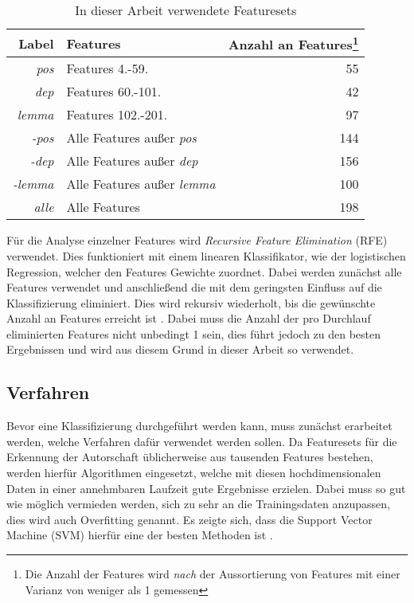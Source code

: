 \begin{table}[h]
\centering
\begin{spacing}{1.25}
\begin{tabular}{rlr}
Label & Features & Anzahl an Features\footnote{Die Anzahl der Features wird \emph{nach} der Aussortierung von Features mit einer Varianz von weniger als 1 gemessen}\\
\midrule
\emph{pos} & Features 4.-59. & 55\\
\emph{dep} & Features 60.-101. & 42\\
\emph{lemma} & Features 102.-201. & 97\\
\emph{-pos} & Alle Features außer \emph{pos} & 144\\
\emph{-dep} & Alle Features außer \emph{dep}& 156\\
\emph{-lemma} & Alle Features außer \emph{lemma} & 100\\
\emph{alle} & Alle Features & 198\\
\end{tabular}
\caption{In dieser Arbeit verwendete Featuresets}
\label{table.featuresets}
\end{spacing}
\end{table}

Für die Analyse einzelner Features wird \textit{Recursive Feature Elimination} (RFE) verwendet. Dies funktioniert mit einem linearen Klassifikator, wie der logistischen Regression, welcher den Features Gewichte zuordnet. Dabei werden zunächst alle Features verwendet und anschließend die mit dem geringsten Einfluss auf die Klassifizierung eliminiert. Dies wird rekursiv wiederholt, bis die gewünschte Anzahl an Features erreicht ist \cite[Seite: sklearn.feature\_selection.RFE]{scikitlearnAPIReference}. Dabei muss die Anzahl der pro Durchlauf eliminierten Features nicht unbedingt 1 sein, dies führt jedoch zu den besten Ergebnissen und wird aus diesem Grund in dieser Arbeit so verwendet.

\subsection{Verfahren}
Bevor eine Klassifizierung durchgeführt werden kann, muss zunächst erarbeitet werden, welche Verfahren dafür verwendet werden sollen. Da Featuresets für die Erkennung der Autorschaft üblicherweise aus tausenden Features bestehen, werden hierfür Algorithmen eingesetzt, welche mit diesen hochdimensionalen Daten in einer annehmbaren Laufzeit gute Ergebnisse erzielen. Dabei muss so gut wie möglich vermieden werden, sich zu sehr an die Trainingsdaten anzupassen, dies wird auch Overfitting genannt. Es zeigte sich, dass die Support Vector Machine (SVM) hierfür eine der besten Methoden ist \cite{li2006fingerprint, stamatatos2009survey}.

